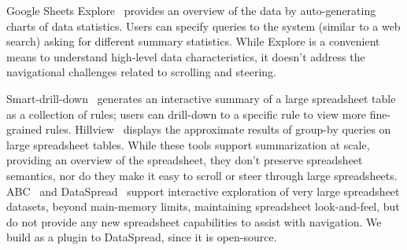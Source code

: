Google Sheets Explore~\cite{web:explore} provides
an overview of the data by
auto-generating charts of data statistics.
Users can specify queries to the system
(similar to a web search)
asking for different summary statistics.
While Explore
is a convenient means to understand
high-level data characteristics,
it doesn't address the
navigational challenges
related to scrolling and steering.  
 

Smart-drill-down~\cite{joglekar2015smart}
generates an interactive summary of a large spreadsheet table as
a collection of rules; users can drill-down to
a specific rule to view more fine-grained rules.
Hillview~\cite{web:hillview} displays
the approximate results of group-by queries
on large spreadsheet tables.
While these tools support summarization at scale,
providing an overview of the spreadsheet,
they don't preserve spreadsheet semantics,
nor do they make it easy to scroll or steer
through large spreadsheets.
ABC~\cite{Raman99scalablespreadsheets} and {\sc DataSpread}~\cite{datamodels} support interactive
exploration of very large spreadsheet datasets,
beyond main-memory limits, maintaining spreadsheet look-and-feel,
but do not provide any new spreadsheet capabilities to assist
with navigation.
We build \noah as a plugin
to {\sc DataSpread}, since it is open-source.


